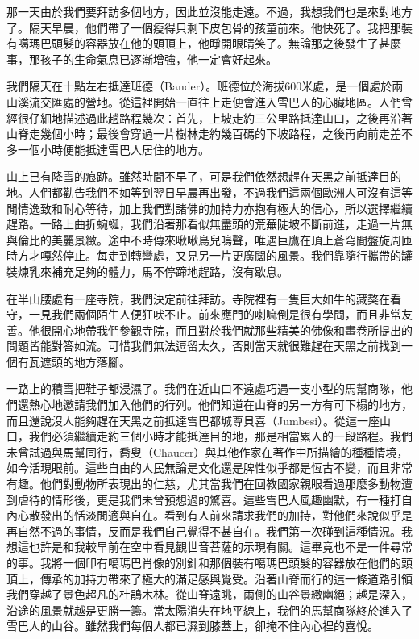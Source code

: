 那一天由於我們要拜訪多個地方，因此並沒能走遠。不過，我想我們也是來對地方了。隔天早晨，他們帶了一個瘦得只剩下皮包骨的孩童前來。他快死了。我把那裝有噶瑪巴頭髮的容器放在他的頭頂上，他睜開眼睛笑了。無論那之後發生了甚麼事，那孩子的生命氣息已逐漸增強，他一定會好起來。

我們隔天在十點左右抵達班德（Bander）。班德位於海拔600米處，是一個處於兩山溪流交匯處的營地。從這裡開始一直往上走便會進入雪巴人的心臟地區。人們曾經很仔細地描述過此趟路程幾次：首先，上坡走約三公里路抵達山口，之後再沿著山脊走幾個小時；最後會穿過一片樹林走約幾百碼的下坡路程，之後再向前走差不多一個小時便能抵達雪巴人居住的地方。

山上已有降雪的痕跡。雖然時間不早了，可是我們依然想趕在天黑之前抵達目的地。人們都勸告我們不如等到翌日早晨再出發，不過我們這兩個歐洲人可沒有這等閒情逸致和耐心等待，加上我們對諸佛的加持力亦抱有極大的信心，所以選擇繼續趕路。一路上曲折蜿蜒，我們沿著那看似無盡頭的荒蕪陡坡不斷前進，走過一片無與倫比的美麗景緻。途中不時傳來啾啾鳥兒鳴聲，唯遇巨鷹在頂上蒼穹間盤旋周匝時方才嘎然停止。每走到轉彎處，又見另一片更廣闊的風景。我們靠隨行攜帶的罐裝煉乳來補充足夠的體力，馬不停蹄地趕路，沒有歇息。

在半山腰處有一座寺院，我們決定前往拜訪。寺院裡有一隻巨大如牛的藏獒在看守，一見我們兩個陌生人便狂吠不止。前來應門的喇嘛倒是很有學問，而且非常友善。他很開心地帶我們參觀寺院，而且對於我們就那些精美的佛像和畫卷所提出的問題皆能對答如流。可惜我們無法逗留太久，否則當天就很難趕在天黑之前找到一個有瓦遮頭的地方落腳。

一路上的積雪把鞋子都浸濕了。我們在近山口不遠處巧遇一支小型的馬幫商隊，他們還熱心地邀請我們加入他們的行列。他們知道在山脊的另一方有可下榻的地方，而且還說沒人能夠趕在天黑之前抵達雪巴都城尊貝喜（Jumbesi）。從這一座山口，我們必須繼續走約三個小時才能抵達目的地，那是相當累人的一段路程。我們未曾試過與馬幫同行，喬叟（Chaucer）與其他作家在著作中所描繪的種種情境，如今活現眼前。這些自由的人民無論是文化還是脾性似乎都是恆古不變，而且非常有趣。他們對動物所表現出的仁慈，尤其當我們在回教國家親眼看過那麼多動物遭到虐待的情形後，更是我們未曾預想過的驚喜。這些雪巴人風趣幽默，有一種打自內心散發出的恬淡閒適與自在。看到有人前來請求我們的加持，對他們來說似乎是再自然不過的事情，反而是我們自己覺得不甚自在。我們第一次碰到這種情況。我想這也許是和我較早前在空中看見觀世音菩薩的示現有關。這畢竟也不是一件尋常的事。我將一個印有噶瑪巴肖像的別針和那個裝有噶瑪巴頭髮的容器放在他們的頭頂上，傳承的加持力帶來了極大的滿足感與覺受。沿著山脊而行的這一條道路引領我們穿越了景色超凡的杜鵑木林。從山脊遠眺，兩側的山谷景緻幽絕；越是深入，沿途的風景就越是更勝一籌。當太陽消失在地平線上，我們的馬幫商隊終於進入了雪巴人的山谷。雖然我們每個人都已濕到膝蓋上，卻掩不住內心裡的喜悅。

